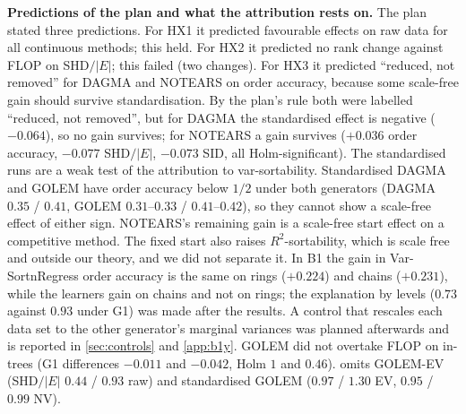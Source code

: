 \textbf{Predictions of the plan and what the attribution rests on.} The plan
stated three predictions. For HX1 it predicted favourable effects on raw data
for all continuous methods; this held. For HX2 it predicted no rank change
against FLOP on SHD$/|E|$; this failed (two changes). For HX3 it predicted
``reduced, not removed'' for DAGMA and NOTEARS on order accuracy, because some
scale-free gain should survive standardisation. By the plan's rule both were
labelled ``reduced, not removed'', but for DAGMA the standardised effect is
negative ($-0.064$), so no gain survives; for NOTEARS a gain survives
($+0.036$ order accuracy, $-0.077$ SHD$/|E|$, $-0.073$ SID, all
Holm-significant). The standardised runs are a weak test of the attribution
to var-sortability. Standardised DAGMA and GOLEM have order accuracy below
$1/2$ under both generators (DAGMA $0.35$ / $0.41$, GOLEM $0.31$--$0.33$ /
$0.41$--$0.42$), so they cannot show a scale-free effect of either sign.
NOTEARS's remaining gain is a scale-free start effect on a competitive
method. The fixed start also raises $R^2$-sortability, which is scale free
and outside our theory, and we did not separate it. In B1 the gain in
Var-SortnRegress order accuracy is the same on rings ($+0.224$) and chains
($+0.231$), while the learners gain on chains and not on rings; the
explanation by levels ($0.73$ against $0.93$ under G1) was made after the
results. A control that rescales each data set to the other generator's
marginal variances was planned afterwards and is reported in
\cref{sec:controls} and \cref{app:b1y}. GOLEM
did not overtake FLOP on in-trees (G1 differences $-0.011$ and $-0.042$, Holm
$1$ and $0.46$).  omits GOLEM-EV (SHD$/|E|$ $0.44$ / $0.93$ raw)
and standardised GOLEM ($0.97$ / $1.30$ EV, $0.95$ / $0.99$ NV).

